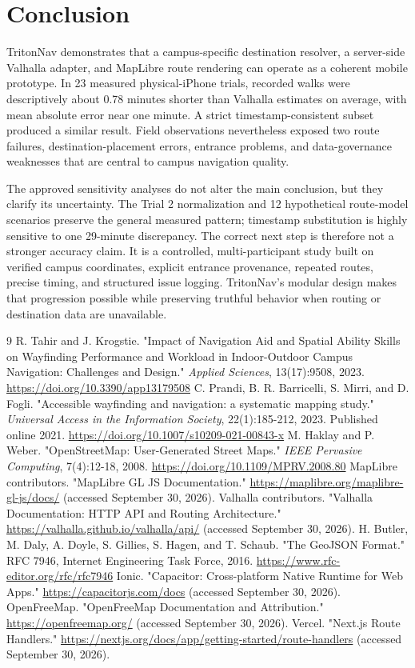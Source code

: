 \documentclass[9pt,twocolumn]{article}
\begin{document}
\section{Conclusion}
TritonNav demonstrates that a campus-specific destination resolver, a server-side Valhalla adapter, and MapLibre route rendering can operate as a coherent mobile prototype. In 23 measured physical-iPhone trials, recorded walks were descriptively about 0.78 minutes shorter than Valhalla estimates on average, with mean absolute error near one minute. A strict timestamp-consistent subset produced a similar result. Field observations nevertheless exposed two route failures, destination-placement errors, entrance problems, and data-governance weaknesses that are central to campus navigation quality.

The approved sensitivity analyses do not alter the main conclusion, but they clarify its uncertainty. The Trial 2 normalization and 12 hypothetical route-model scenarios preserve the general measured pattern; timestamp substitution is highly sensitive to one 29-minute discrepancy. The correct next step is therefore not a stronger accuracy claim. It is a controlled, multi-participant study built on verified campus coordinates, explicit entrance provenance, repeated routes, precise timing, and structured issue logging. TritonNav's modular design makes that progression possible while preserving truthful behavior when routing or destination data are unavailable.

\begin{thebibliography}{9}
 R. Tahir and J. Krogstie. "Impact of Navigation Aid and Spatial Ability Skills on Wayfinding Performance and Workload in Indoor-Outdoor Campus Navigation: Challenges and Design." \textit{Applied Sciences}, 13(17):9508, 2023. \url{https://doi.org/10.3390/app13179508}
 C. Prandi, B. R. Barricelli, S. Mirri, and D. Fogli. "Accessible wayfinding and navigation: a systematic mapping study." \textit{Universal Access in the Information Society}, 22(1):185-212, 2023. Published online 2021. \url{https://doi.org/10.1007/s10209-021-00843-x}
 M. Haklay and P. Weber. "OpenStreetMap: User-Generated Street Maps." \textit{IEEE Pervasive Computing}, 7(4):12-18, 2008. \url{https://doi.org/10.1109/MPRV.2008.80}
 MapLibre contributors. "MapLibre GL JS Documentation." \url{https://maplibre.org/maplibre-gl-js/docs/} (accessed September 30, 2026).
 Valhalla contributors. "Valhalla Documentation: HTTP API and Routing Architecture." \url{https://valhalla.github.io/valhalla/api/} (accessed September 30, 2026).
 H. Butler, M. Daly, A. Doyle, S. Gillies, S. Hagen, and T. Schaub. "The GeoJSON Format." RFC 7946, Internet Engineering Task Force, 2016. \url{https://www.rfc-editor.org/rfc/rfc7946}
 Ionic. "Capacitor: Cross-platform Native Runtime for Web Apps." \url{https://capacitorjs.com/docs} (accessed September 30, 2026).
 OpenFreeMap. "OpenFreeMap Documentation and Attribution." \url{https://openfreemap.org/} (accessed September 30, 2026).
 Vercel. "Next.js Route Handlers." \url{https://nextjs.org/docs/app/getting-started/route-handlers} (accessed September 30, 2026).
\end{thebibliography}
\end{document}
